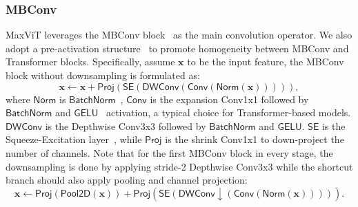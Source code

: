 \documentclass[runningheads]{llncs}
\begin{document}
\subsubsection{MBConv}
MaxViT leverages the MBConv block~\cite{sandler2018mobilenetv2,tan2019efficientnet} as the main convolution operator. We also adopt a pre-activation structure~\cite{he2016identity,dai2021coatnet} to promote homogeneity between MBConv and Transformer blocks. Specifically, assume $\mathbf{x}$ to be the input feature, the MBConv block without downsampling is formulated as:
\begin{equation}
\label{eq:mbconv}
\mathbf{x}\leftarrow \mathbf{x}+ \mathsf{Proj}(\mathsf{SE}(\mathsf{DWConv}(\mathsf{Conv}(\mathsf{Norm}(\mathbf{x}))))),
\end{equation}
\sloppy where $\mathsf{Norm}$ is $\mathsf{BatchNorm}$~\cite{ioffe2015batch}, $\mathsf{Conv}$ is the expansion Conv1x1 followed by $\mathsf{BatchNorm}$ and $\mathsf{GELU}$~\cite{hendrycks2016gaussian} activation, a typical choice for Transformer-based models. $\mathsf{DWConv}$ is the Depthwise Conv3x3 followed by $\mathsf{BatchNorm}$ and $\mathsf{GELU}$. $\mathsf{SE}$ is the Squeeze-Excitation layer~\cite{hu2018squeeze}, while $\mathsf{Proj}$ is the shrink Conv1x1 to down-project the number of channels. Note that for the first MBConv block in every stage, the downsampling is done by applying stride-2 Depthwise Conv3x3 while the shortcut branch should also apply pooling and channel projection:
\begin{equation}
\label{eq:mbconv-downsampling}
\mathbf{x}\leftarrow \mathsf{Proj}(\mathsf{Pool2D}(\mathbf{x}))+ \mathsf{Proj}(\mathsf{SE}(\mathsf{DWConv}\!\downarrow\!(\mathsf{Conv}(\mathsf{Norm}(\mathbf{x}))))).
\end{equation}
\end{document}
